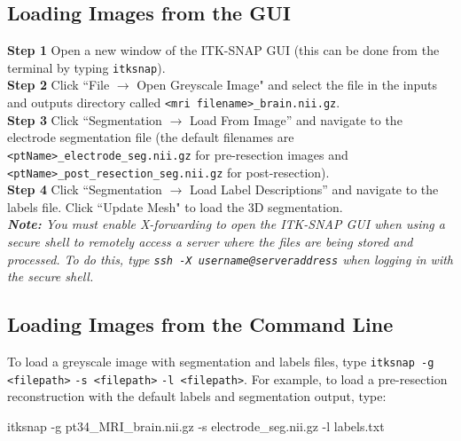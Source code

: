 \documentclass[12pt]{article}
\begin{document}
\subsection{Loading Images from the GUI}
\textbf{Step 1} Open a new window of the ITK-SNAP GUI (this can be done from the terminal by typing \texttt{itksnap}). \\
\textbf{Step 2} Click ``File $\rightarrow$ Open Greyscale Image" and select the file in the inputs and outputs directory called \texttt{<mri filename>\_brain.nii.gz}. \\
\textbf{Step 3} Click ``Segmentation $\rightarrow$ Load From Image'' and navigate to the electrode segmentation file (the default filenames are \texttt{<ptName>\_electrode\_seg.nii.gz} for pre-resection images and \texttt{<ptName>\_post\_resection\_seg.nii.gz} for  post-resection).\\
\textbf{Step 4} Click ``Segmentation $\rightarrow$ Load Label Descriptions'' and navigate to the labels file. Click ``Update Mesh" to load the 3D segmentation.\\

\emph{\textbf{Note:} You must enable X-forwarding to open the ITK-SNAP GUI when using a secure shell to remotely access a server where the files are being stored and processed. To do this, type \texttt{ssh -X username@serveraddress} when logging in with the secure shell.}


\subsection{Loading Images from the Command Line}
To load a greyscale image with segmentation and labels files, type \texttt{itksnap -g <filepath>} \texttt{-s <filepath>} \texttt{-l <filepath>}. For example, to load a pre-resection reconstruction with the default labels and segmentation output, type: 

\begin{small}
\begin{verb}
itksnap -g pt34_MRI_brain.nii.gz -s electrode_seg.nii.gz -l labels.txt
\end{verb} 
\end{small}
\end{document}
